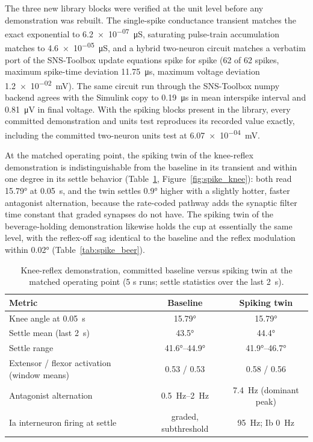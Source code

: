 The three new library blocks were verified at the unit level before any demonstration was rebuilt. The single-spike conductance transient matches the exact exponential to \qty{6.2e-07}{\micro\siemens}, saturating pulse-train accumulation matches to \qty{4.6e-05}{\micro\siemens}, and a hybrid two-neuron circuit matches a verbatim port of the SNS-Toolbox update equations spike for spike (62 of 62 spikes, maximum spike-time deviation \qty{11.75}{\micro\second}, maximum voltage deviation \qty{1.2e-02}{\mV}). The same circuit run through the SNS-Toolbox numpy backend agrees with the Simulink copy to \qty{0.19}{\micro\second} in mean interspike interval and \qty{0.81}{\micro\volt} in final voltage. With the spiking blocks present in the library, every committed demonstration and units test reproduces its recorded value exactly, including the committed two-neuron units test at \qty{6.07e-04}{\mV}.

At the matched operating point, the spiking twin of the knee-reflex demonstration is indistinguishable from the baseline in its transient and within one degree in its settle behavior (Table~\ref{tab:spike_knee}, Figure~\ref{fig:spike_knee}): both read \ang{15.79} at \qty{0.05}{\second}, and the twin settles \ang{0.9} higher with a slightly hotter, faster antagonist alternation, because the rate-coded pathway adds the synaptic filter time constant that graded synapses do not have. The spiking twin of the beverage-holding demonstration likewise holds the cup at essentially the same level, with the reflex-off sag identical to the baseline and the reflex modulation within \ang{0.02} (Table~\ref{tab:spike_beer}).

\begin{table}[htbp]
\caption{Knee-reflex demonstration, committed baseline versus spiking twin at the matched operating point (5 s runs; settle statistics over the last \qty{2}{\second}).}
\label{tab:spike_knee}
\begin{tabular}{@{}lcc@{}}
\toprule
\textbf{Metric} & \textbf{Baseline} & \textbf{Spiking twin} \\
\midrule
Knee angle at \qty{0.05}{\second}   & \ang{15.79} & \ang{15.79} \\
Settle mean (last \qty{2}{\second}) & \ang{43.5}  & \ang{44.4} \\
Settle range                        & \ang{41.6}--\ang{44.9} & \ang{41.9}--\ang{46.7} \\
Extensor / flexor activation (window means) & 0.53 / 0.53 & 0.58 / 0.56 \\
Antagonist alternation              & \qty{0.5}{\hertz}--\qty{2}{\hertz} & \qty{7.4}{\hertz} (dominant peak) \\
Ia interneuron firing at settle     & graded, subthreshold & \qty{95}{\hertz}; Ib \qty{0}{\hertz} \\
\bottomrule
\end{tabular}
\end{table}

